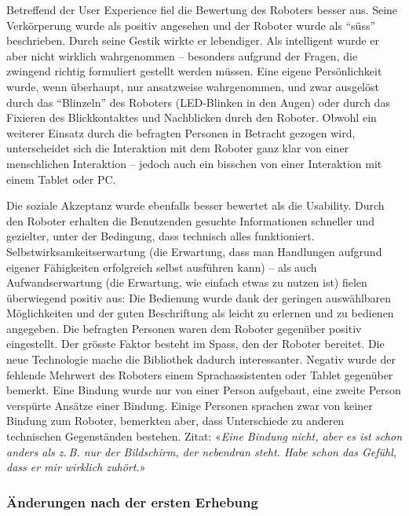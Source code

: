 \documentclass[a4paper,
fontsize=11pt,
oneside,
numbers=noperiodatend,
parskip=half-,
bibliography=totoc,
final
]{scrartcl}
\begin{document}
Betreffend der User Experience fiel die Bewertung des Roboters besser
aus. Seine Verkörperung wurde als positiv angesehen und der Roboter
wurde als \enquote{süss} beschrieben. Durch seine Gestik wirkte er lebendiger.
Als intelligent wurde er aber nicht wirklich wahrgenommen -- besonders
aufgrund der Fragen, die zwingend richtig formuliert gestellt werden
müssen. Eine eigene Persönlichkeit wurde, wenn überhaupt, nur
ansatzweise wahrgenommen, und zwar ausgelöst durch das \enquote{Blinzeln} des
Roboters (LED-Blinken in den Augen) oder durch das Fixieren des
Blickkontaktes und Nachblicken durch den Roboter. Obwohl ein weiterer
Einsatz durch die befragten Personen in Betracht gezogen wird,
unterscheidet sich die Interaktion mit dem Roboter ganz klar von einer
menschlichen Interaktion -- jedoch auch ein bisschen von einer
Interaktion mit einem Tablet oder PC.

Die soziale Akzeptanz wurde ebenfalls besser bewertet als die Usability.
Durch den Roboter erhalten die Benutzenden gesuchte Informationen
schneller und gezielter, unter der Bedingung, dass technisch alles
funktioniert. Selbstwirksamkeitserwartung (die Erwartung, dass man
Handlungen aufgrund eigener Fähigkeiten erfolgreich selbst ausführen
kann) -- als auch Aufwandserwartung (die Erwartung, wie einfach etwas zu
nutzen ist) fielen überwiegend positiv aus: Die Bedienung wurde dank der
geringen auswählbaren Möglichkeiten und der guten Beschriftung als
leicht zu erlernen und zu bedienen angegeben. Die befragten Personen
waren dem Roboter gegenüber positiv eingestellt. Der grösste Faktor
besteht im Spass, den der Roboter bereitet. Die neue Technologie mache
die Bibliothek dadurch interessanter. Negativ wurde der fehlende
Mehrwert des Roboters einem Sprachassistenten oder Tablet gegenüber
bemerkt. Eine Bindung wurde nur von einer Person aufgebaut, eine zweite
Person verspürte Ansätze einer Bindung. Einige Personen sprachen zwar
von keiner Bindung zum Roboter, bemerkten aber, dass Unterschiede zu
anderen technischen Gegenständen bestehen. Zitat: «\emph{Eine Bindung
nicht, aber es ist schon anders als z. B. nur der Bildschirm, der
nebendran steht. Habe schon das Gefühl, dass er mir wirklich zuhört.}»

\hypertarget{uxe4nderungen-nach-der-ersten-erhebung}{%
\subsubsection{Änderungen nach der ersten Erhebung}\label{uxe4nderungen-nach-der-ersten-erhebung}}
\end{document}
